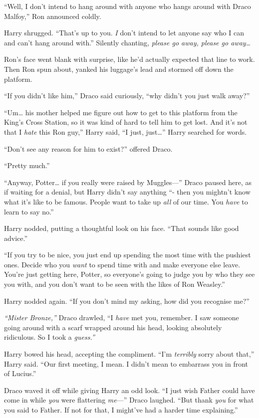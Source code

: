 ``Well, I don't intend to hang around with anyone who hangs around with
Draco Malfoy,'' Ron announced coldly.

Harry shrugged. ``That's up to you. \emph{I} don't intend to let anyone
say who I can and can't hang around with.'' Silently chanting,
\emph{please go away, please go away\ldots{}}

Ron's face went blank with surprise, like he'd actually expected that
line to work. Then Ron spun about, yanked his luggage's lead and stormed
off down the platform.

``If you didn't like him,'' Draco said curiously, ``why didn't you just
walk away?''

``Um\ldots{} his mother helped me figure out how to get to this platform
from the King's Cross Station, so it was kind of hard to tell him to get
lost. And it's not that I \emph{hate} this Ron guy,'' Harry said, ``I
just, just\ldots{}'' Harry searched for words.

``Don't see any reason for him to exist?'' offered Draco.

``Pretty much.''

``Anyway, Potter\ldots{} if you really were raised by Muggles---'' Draco
paused here, as if waiting for a denial, but Harry didn't say anything
``- then you mightn't know what it's like to be famous. People want to
take up \emph{all} of our time. You \emph{have} to learn to say no.''

Harry nodded, putting a thoughtful look on his face. ``That sounds like
good advice.''

``If you try to be nice, you just end up spending the most time with the
pushiest ones. Decide who you \emph{want} to spend time with and make
everyone else leave. You're just getting here, Potter, so everyone's
going to judge you by who they see you with, and you don't want to be
seen with the likes of Ron Weasley.''

Harry nodded again. ``If you don't mind my asking, how did you recognise
me?''

\emph{``Mister Bronze,''} Draco drawled, ``I \emph{have} met you,
remember. I saw someone going around with a scarf wrapped around his
head, looking absolutely ridiculous. So I took a \emph{guess.''}

Harry bowed his head, accepting the compliment. ``I'm \emph{terribly}
sorry about that,'' Harry said. ``Our first meeting, I mean. I didn't
mean to embarrass you in front of Lucius.''

Draco waved it off while giving Harry an odd look. ``I just wish Father
could have come in while \emph{you} were flattering \emph{me}---'' Draco
laughed. ``But thank \emph{you} for what you said to Father. If not for
that, I might've had a harder time explaining.''

